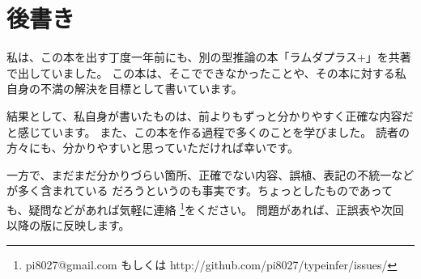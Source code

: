 
\chapter{後書き}

私は、この本を出す丁度一年前にも、別の型推論の本「ラムダプラス+」を共著で出していました。
この本は、そこでできなかったことや、その本に対する私自身の不満の解決を目標として書いています。

結果として、私自身が書いたものは、前よりもずっと分かりやすく正確な内容だと感じています。
また、この本を作る過程で多くのことを学びました。
読者の方々にも、分かりやすいと思っていただければ幸いです。

一方で、まだまだ分かりづらい箇所、正確でない内容、誤植、表記の不統一などが多く含まれている
だろうというのも事実です。ちょっとしたものであっても、疑問などがあれば気軽に連絡
\footnote{pi8027@gmail.com もしくは http://github.com/pi8027/typeinfer/issues/}をください。
問題があれば、正誤表や次回以降の版に反映します。
